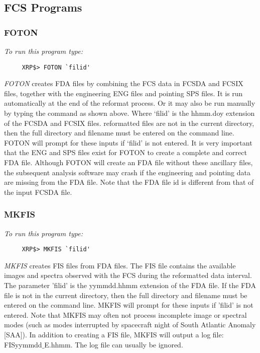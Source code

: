 \subsection{FCS Programs}

\subsubsection{FOTON}

{\em To run this program type:}
\begin{verbatim}
     XRP$> FOTON `filid'
\end{verbatim}
{\em FOTON} creates FDA files by combining the FCS data in FCSDA and FCSIX files,
together with the engineering ENG files and pointing SPS files. It is run
automatically at the end of the reformat process. Or it may also be run manually
by typing the command as shown above.
Where `filid' is the hhmm.doy extension of the FCSDA and FCSIX files.
reformatted files are not in the current directory, then the full directory and
filename must be entered on the command line. FOTON will prompt for these
inputs if `filid' is not entered.  It is very important that the ENG and SPS
files exist for FOTON to create a complete and correct FDA file.  Although
FOTON will create an FDA  file without these ancillary files, the subsequent
analysis software may  crash if the engineering and pointing data are missing
from the FDA file. Note that the FDA file id is different from that of the
input FCSDA file.

\subsubsection{MKFIS}

{\em To run this program type:}
\begin{verbatim}
     XRP$> MKFIS `filid'                 
\end{verbatim}
{\em MKFIS} creates FIS files from FDA files.  The FIS file contains  the
available images and spectra observed with the  FCS during the reformatted data
interval.  The parameter 'filid' is the yymmdd.hhmm extension of  the FDA file.
If the FDA file is not in the current directory, then the full  directory and
filename must be entered on the command line. MKFIS will prompt  for these
inputs if 'filid' is not entered. Note that MKFIS may often not  process
incomplete image or spectral modes (such as modes interrupted by  spacecraft
night of South Atlantic Anomaly [SAA]). In addition to creating a FIS  file,
MKFIS will output a log file: FISyymmdd$\_$E.hhmm. The log file can usually  be
ignored.

